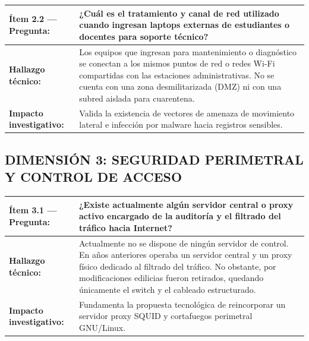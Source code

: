 \documentclass[10pt,letterpaper]{article}
\begin{document}
\begin{table}[h!]
  \centering
  \scriptsize
  \renewcommand{\arraystretch}{1.2}
  \begin{tabularx}{\textwidth}{@{}>{\bfseries\color{unabblue}}p{3.2cm} X@{}}
    \toprule
    Ítem 2.2 — Pregunta: & ¿Cuál es el tratamiento y canal de red utilizado cuando ingresan laptops externas de estudiantes o docentes para soporte técnico? \\
    \midrule
    Hallazgo técnico: & Los equipos que ingresan para mantenimiento o diagnóstico se conectan a los mismos puntos de red o redes Wi-Fi compartidas con las estaciones administrativas. No se cuenta con una zona desmilitarizada (DMZ) ni con una subred aislada para cuarentena. \\
    Impacto investigativo: & Valida la existencia de vectores de amenaza de movimiento lateral e infección por malware hacia registros sensibles. \\
    \bottomrule
  \end{tabularx}
\end{table}

\subsection*{\color{unabblue}\small DIMENSIÓN 3: SEGURIDAD PERIMETRAL Y CONTROL DE ACCESO}

\begin{table}[h!]
  \centering
  \scriptsize
  \renewcommand{\arraystretch}{1.2}
  \begin{tabularx}{\textwidth}{@{}>{\bfseries\color{unabblue}}p{3.2cm} X@{}}
    \toprule
    Ítem 3.1 — Pregunta: & ¿Existe actualmente algún servidor central o proxy activo encargado de la auditoría y el filtrado del tráfico hacia Internet? \\
    \midrule
    Hallazgo técnico: & Actualmente no se dispone de ningún servidor de control. En años anteriores operaba un servidor central y un proxy físico dedicado al filtrado del tráfico. No obstante, por modificaciones edilicias fueron retirados, quedando únicamente el switch y el cableado estructurado. \\
    Impacto investigativo: & Fundamenta la propuesta tecnológica de reincorporar un servidor proxy SQUID y cortafuegos perimetral GNU/Linux. \\
    \bottomrule
  \end{tabularx}
\end{table}
\end{document}
